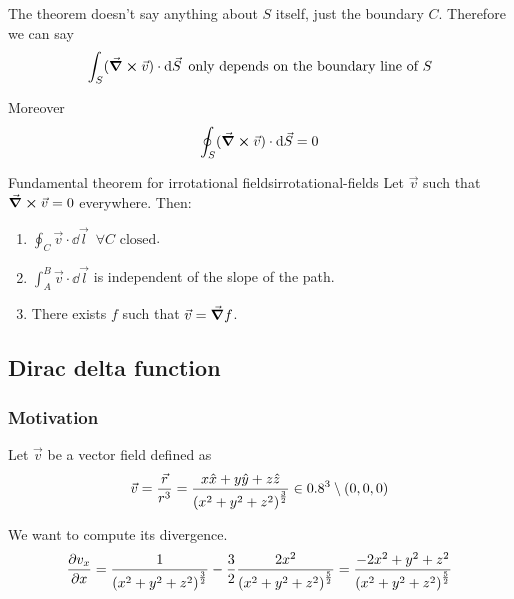 \documentclass[12pt]{extarticle}
\begin{document}
\begin{corollary}{}{}
	The theorem doesn't say anything about $S$ itself, just the boundary $C$.
	Therefore we can say
	\begin{equation}
		\int_S (\curl \vec v) \cdot \dd{\vec S} \text{ only depends on the boundary line of } S
	\end{equation}

	Moreover
	\begin{equation}
		\oint_S (\curl \vec v) \cdot \dd{\vec S} = 0
	\end{equation}
\end{corollary}

\begin{theorem}{Fundamental theorem for irrotational fields}{irrotational-fields}
	Let $\vec v$ such that $\curl \vec v = 0$ everywhere.
	Then:
	\begin{enumerate}
		\item $\oint_C \vec v \cdot \dd{\vec l} \enspace \forall C \text{ closed}$.
		\item $\int_A^B \vec v \cdot \dd{\vec l}$ is independent of the slope of the path.
		\item There exists $f$ such that $\vec v = \grad f$.
	\end{enumerate}
\end{theorem}

\subsection{Dirac delta function}

\subsubsection{Motivation}

Let $\vec v$ be a vector field defined as
\begin{equation}
	\vec v = \frac{\vec r}{r^3} = \frac{x \hat x + y \hat y + z \hat z}{\left( x^2 + y^2 + z^2\right)^{\frac{3}{2}}} \in 0.8^3 \setminus (0,0,0)
\end{equation}

We want to compute its divergence.
\begin{equation}
	\pdv{v_x}{x} = \frac{1}{\left( x^2 + y^2 + z^2\right)^{\frac{3}{2}}} - \frac{3}{2}\frac{2 x^2}{\left( x^2 + y^2 + z^2\right)^{\frac{5}{2}}} = \frac{-2x^2 + y^2 + z^2}{\left( x^2 + y^2 + z^2\right)^{\frac{5}{2}}}
\end{equation}
\end{document}
